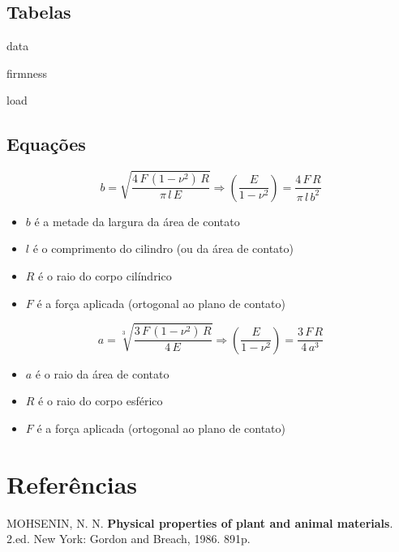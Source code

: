\documentclass[a4paper, brazilian]{article}
\begin{document}
	\subsection{Tabelas}
	
	{data}
	
	{firmness}

	{load}
	
	\subsection{Equações}
		
	\begin{equation}
		\label{lobo}
		b=\sqrt{\dfrac{4\,F\,(1-\nu^{2})\,R}{\pi\,l\,E}}\Rightarrow \left(\dfrac{E}{1-\nu^{2}}\right)=\dfrac{4\,F\,R}{\pi\,l\,b^{2}}
	\end{equation}
	
	\begin{itemize}
		\item $b$ é a metade da largura da área de contato
		\item $l$ é o comprimento do cilindro (ou da área de contato)
		\item $R$ é o raio do corpo cilíndrico
		\item $F$ é a força aplicada (ortogonal ao plano de contato)
	\end{itemize}	
	
	\begin{equation}
		\label{hertz}
		a=\sqrt[3]{\dfrac{3\,F\,(1-\nu^{2})\,R}{4\,E}}\Rightarrow\left(\dfrac{E}{1-\nu^{2}}\right)=\dfrac{3\,F\,R}{4\,a^{3}}
	\end{equation}
	
	\begin{itemize}
		\item $a$ é o raio da área de contato
		\item $R$ é o raio do corpo esférico
		\item $F$ é a força aplicada (ortogonal ao plano de contato)
	\end{itemize}

	\section{Referências}
	
	MOHSENIN, N. N. \textbf{Physical properties of plant and animal materials}. 2.ed. New York: Gordon and Breach, 1986. 891p.
\end{document}
